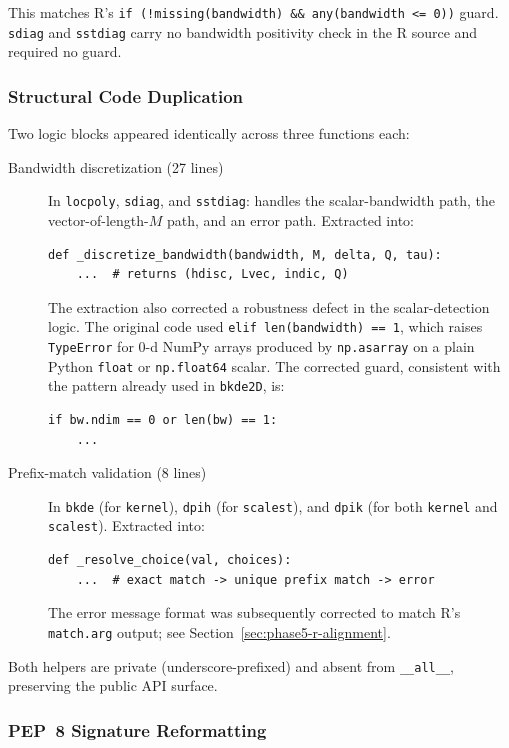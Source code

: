 \documentclass[12pt,a4paper]{article}
\begin{document}
This matches R's \texttt{if (!missing(bandwidth) \&\& any(bandwidth <= 0))} guard. \texttt{sdiag} and \texttt{sstdiag} carry no bandwidth positivity check in the R source and required no guard.

\subsubsection{Structural Code Duplication}

Two logic blocks appeared identically across three functions each:

\begin{description}
  \item[Bandwidth discretization (27 lines)] In \texttt{locpoly}, \texttt{sdiag}, and \texttt{sstdiag}: handles the scalar-bandwidth path, the vector-of-length-$M$ path, and an error path. Extracted into:
    \begin{lstlisting}[style=python]
def _discretize_bandwidth(bandwidth, M, delta, Q, tau):
    ...  # returns (hdisc, Lvec, indic, Q)
    \end{lstlisting}
    The extraction also corrected a robustness defect in the scalar-detection logic. The original code used \texttt{elif len(bandwidth) == 1}, which raises \texttt{TypeError} for 0-d NumPy arrays produced by \texttt{np.asarray} on a plain Python \texttt{float} or \texttt{np.float64} scalar. The corrected guard, consistent with the pattern already used in \texttt{bkde2D}, is:
    \begin{lstlisting}[style=python]
if bw.ndim == 0 or len(bw) == 1:
    ...
    \end{lstlisting}
  \item[Prefix-match validation (8 lines)] In \texttt{bkde} (for \texttt{kernel}), \texttt{dpih} (for \texttt{scalest}), and \texttt{dpik} (for both \texttt{kernel} and \texttt{scalest}). Extracted into:
    \begin{lstlisting}[style=python]
def _resolve_choice(val, choices):
    ...  # exact match -> unique prefix match -> error
    \end{lstlisting}
    The error message format was subsequently corrected to match R's \texttt{match.arg} output; see Section~\ref{sec:phase5-r-alignment}.
\end{description}

Both helpers are private (underscore-prefixed) and absent from \texttt{\_\_all\_\_}, preserving the public API surface.

\subsubsection{PEP~8 Signature Reformatting}
\end{document}
